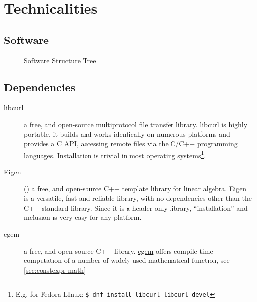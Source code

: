 \chapter{Technicalities}
\label{ch:technicalities}

\section{Software}
\label{se:software}

\begin{figure}
\centering

\caption{Software Structure Tree}
\label{fig:software-structure-tree}
\end{figure}

\section{Dependencies}
\begin{description}
    \item [libcurl] a free, and open-source multiprotocol file transfer library.
    \href{https://curl.se/libcurl/}{libcurl} is highly portable, it builds and works 
    identically on numerous platforms and provides a \href{https://curl.se/libcurl/c/}{C API}, 
    accessing remote files via the C/C++ programming languages. Installation is 
    trivial in most operating systems\footnote{E.g. for Fedora LInux: \lstinline[language=bash]|$ dnf install libcurl libcurl-devel|}.
    
    \item [Eigen] (\cite{eigenweb}) a free, and open-source C++ template library 
    for linear algebra. 
    \href{https://eigen.tuxfamily.org/index.php?title=Main_Page}{Eigen} is a 
    versatile, fast and reliable library, with no dependencies other than the 
    C++ standard library. Since it is a header-only library, ``installation'' 
    and inclusion is very easy for any platform.

    \item [cgem] a free, and open-source C++ library. 
    \href{https://www.kthohr.com/gcem.html}{cgem} offers compile-time 
    computation of a number of widely used mathematical function, see
    \ref{sec:constexpr-math}

\end{description}

